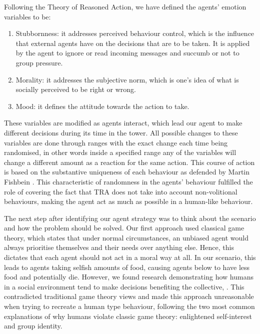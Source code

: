 Following the Theory of Reasoned Action, we have defined the agents’ emotion variables to be: 
\begin{enumerate}
    \item Stubbornness: it addresses perceived behaviour control, which is the influence that external agents have on the decisions that are to be taken. It is applied by the agent to ignore or read incoming messages and succumb or not to group pressure. 
    \item Morality: it addresses the subjective norm, which is one's idea of what is socially perceived to be right or wrong.
    \item Mood: it defines the attitude towards the action to take.
\end{enumerate}
These variables are modified as agents interact, which lead our agent to make different decisions during its time in the tower. All possible changes to these variables are done through ranges with the exact change each time being randomised, in other words inside a specified range any of the variables will change a different amount as a reaction for the same action. This course of action is based on the substantive uniqueness of each behaviour as defended by Martin Fishbein \cite{TRA}. This characteristic of randomness in the agents’ behaviour fulfilled the role of covering the fact that TRA does not take into account non-volitional behaviours, making the agent act as much as possible in a human-like behaviour. \par
The next step after identifying our agent strategy was to think about the scenario and how the problem should be solved. Our first approach used classical game theory, which states that under normal circumstances, an unbiased agent would always prioritise themselves and their needs over anything else. Hence, this dictates that each agent should not act in a moral way at all. In our scenario, this leads to agents taking selfish amounts of food, causing agents below to have less food and potentially die. However, we found research demonstrating how humans in a social environment tend to make decisions benefiting the collective, \cite{batson_batson_todd_brummett_shaw_aldeguer_1995}. This contradicted traditional game theory views and made this approach unreasonable when trying to recreate a human type behaviour, following the two most common explanations of why humans violate classic game theory: enlightened self-interest and group identity. 


